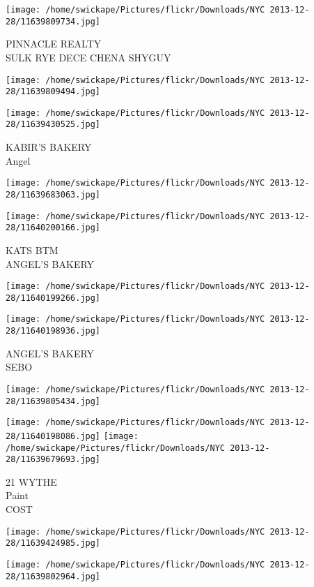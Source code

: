 \documentclass[10pt,letterpaper]{article}
\begin{document}
\vspace{0.25in}
\texttt{[image: /home/swickape/Pictures/flickr/Downloads/NYC 2013-12-28/11639809734.jpg]}

PINNACLE REALTY\\
SULK RYE DECE CHENA SHYGUY
\pagebreak

\texttt{[image: /home/swickape/Pictures/flickr/Downloads/NYC 2013-12-28/11639809494.jpg]}

\vspace{0.25in}
\texttt{[image: /home/swickape/Pictures/flickr/Downloads/NYC 2013-12-28/11639430525.jpg]}

KABIR'S BAKERY\\
Angel
\pagebreak

\texttt{[image: /home/swickape/Pictures/flickr/Downloads/NYC 2013-12-28/11639683063.jpg]}

\vspace{0.25in}
\texttt{[image: /home/swickape/Pictures/flickr/Downloads/NYC 2013-12-28/11640200166.jpg]}

KATS BTM\\
ANGEL'S BAKERY
\pagebreak

\texttt{[image: /home/swickape/Pictures/flickr/Downloads/NYC 2013-12-28/11640199266.jpg]}

\vspace{0.25in}
\texttt{[image: /home/swickape/Pictures/flickr/Downloads/NYC 2013-12-28/11640198936.jpg]}

ANGEL'S BAKERY\\
SEBO
\pagebreak

\texttt{[image: /home/swickape/Pictures/flickr/Downloads/NYC 2013-12-28/11639805434.jpg]}

\vspace{0.25in}
\texttt{[image: /home/swickape/Pictures/flickr/Downloads/NYC 2013-12-28/11640198086.jpg]}
\texttt{[image: /home/swickape/Pictures/flickr/Downloads/NYC 2013-12-28/11639679693.jpg]}

21 WYTHE\\
Paint\\
COST
\pagebreak

\texttt{[image: /home/swickape/Pictures/flickr/Downloads/NYC 2013-12-28/11639424985.jpg]}

\vspace{0.25in}
\texttt{[image: /home/swickape/Pictures/flickr/Downloads/NYC 2013-12-28/11639802964.jpg]}
\end{document}

